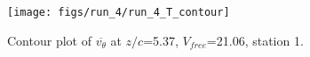 \begin{figure}[H]
\centering
\texttt{[image: figs/run\_4/run\_4\_T\_contour]}
\caption{Contour plot of $\overline{v_{\theta}}$ at $z/c$=5.37, $V_{free}$=21.06, station 1.}
\label{fig:run_4_T_contour}
\end{figure}


